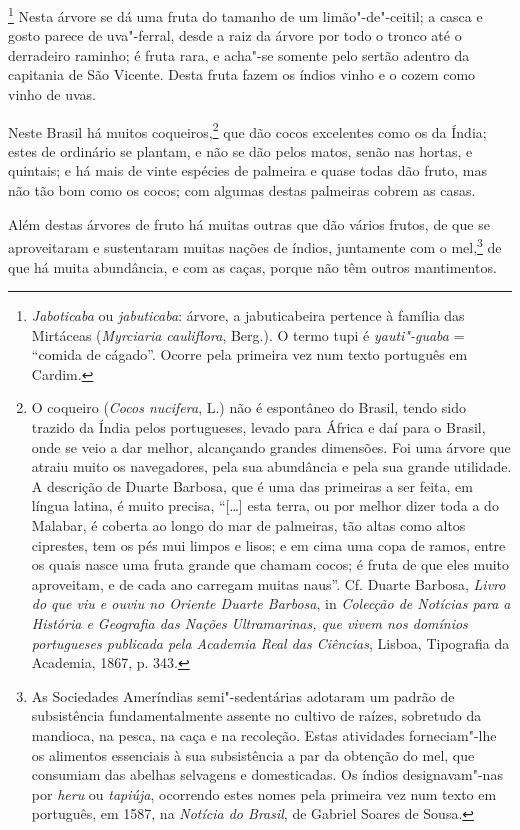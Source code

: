 \footnote{ \textit{Jaboticaba} ou
\textit{jabuticaba}: árvore, a jabuticabeira pertence à família das
Mirtáceas (\textit{Myrciaria cauliflora}, Berg.). O termo tupi é
\textit{yauti"-guaba} = ``comida de cágado''. Ocorre pela primeira vez num
texto português em Cardim.} Nesta árvore se dá uma fruta do
tamanho de um limão"-de"-ceitil; a casca e gosto parece de uva"-ferral,
desde a raiz da árvore por todo o tronco até o derradeiro raminho; é
fruta rara, e acha"-se somente pelo sertão adentro da capitania de São
Vicente. Desta fruta fazem os índios vinho e o cozem como vinho de uvas.

Neste Brasil há muitos coqueiros,\footnote{ O coqueiro (\textit{Cocos
nucifera}, L.) não é espontâneo do Brasil, tendo sido trazido da Índia
pelos portugueses, levado para África e daí para o Brasil, onde se veio
a dar melhor, alcançando grandes dimensões. Foi uma árvore que atraiu
muito os navegadores, pela sua abundância e pela sua grande utilidade.
A descrição de Duarte Barbosa, que é uma das primeiras a ser feita, em
língua latina, é muito precisa, ``[\ldots] esta terra, ou por
melhor dizer toda a do Malabar, é coberta ao longo do mar de palmeiras,
tão altas como altos ciprestes, tem os pés mui limpos e lisos; e em
cima uma copa de ramos, entre os quais nasce uma fruta grande que
chamam cocos; é fruta de que eles muito aproveitam, e de cada ano
carregam muitas naus''. Cf. Duarte Barbosa, \textit{Livro do
que viu e ouviu no Oriente Duarte Barbosa}, in \textit{Colecção de
Notícias para a História e Geografia das Nações Ultramarinas, que vivem
nos domínios portugueses publicada pela Academia Real das Ciências}, 
Lisboa, Tipografia da Academia, 1867, p. 343.} que dão cocos
excelentes como os da Índia; estes de ordinário se plantam, e não se
dão pelos matos, senão nas hortas, e quintais; e há mais de vinte
espécies de palmeira e quase todas dão fruto, mas não tão bom como os
cocos; com algumas destas palmeiras cobrem as casas.

 Além destas árvores de fruto há muitas outras que dão vários frutos, de
que se aproveitaram e sustentaram muitas nações de índios, juntamente
com o mel,\footnote{ As Sociedades Ameríndias semi"-sedentárias
adotaram um padrão de subsistência fundamentalmente assente no
cultivo de raízes, sobretudo da mandioca, na pesca, na caça e na
recoleção. Estas atividades forneciam"-lhe os alimentos essenciais à
sua subsistência a par da obtenção do mel, que consumiam das abelhas
selvagens e domesticadas. Os índios designavam"-nas por \textit{heru} ou
\textit{tapiúja}, ocorrendo estes nomes pela primeira vez num texto em
português, em 1587, na \textit{Notícia do Brasil}, de Gabriel Soares de
Sousa.} de que há muita abundância, e com as caças, porque não têm outros mantimentos.

